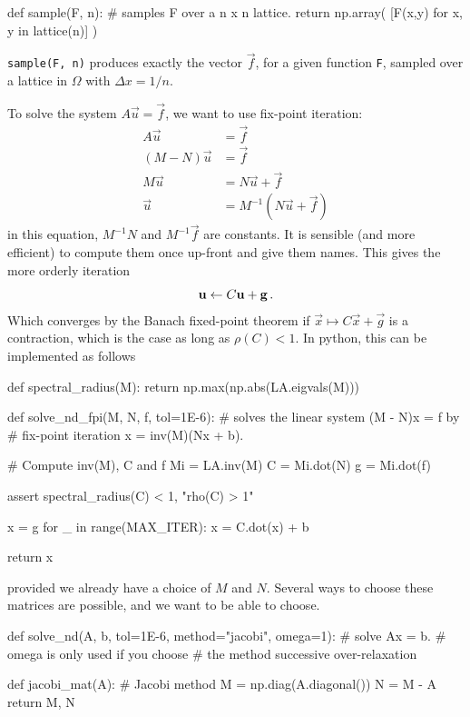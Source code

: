 \documentclass[12pt]{article}
\begin{document}
\begin{multicols}{2}
\begin{python}[
        caption={Program to sample functions over lattices}
    ]
def sample(F, n):
    # samples F over a n x n lattice.
    return np.array(
        [F(x,y) for x, y in lattice(n)]
    )
    \end{python}
    {\tt sample(F, n)} produces exactly the vector $\vec f$,
    for a given function {\tt F}, sampled over a lattice
    in $\Omega$ with $\Delta x = 1/n$.

    To solve the system $A\vec u = \vec f$, we want to use
    fix-point iteration:
    \begin{align*}
        A \vec u &= \vec f \\
        (M - N) \vec u &= \vec f \\
        M \vec u &= N \vec u + \vec f \\
        \vec u &= M^{-1} (N \vec u + \vec f)
    \end{align*}
    in this equation, $M^{-1}N$ and $M^{-1}\vec f$ are constants.
    It is sensible (and more efficient) to compute them once up-front and give them
    names.
    This gives the more orderly iteration
    \[
        \vec u \leftarrow C\vec u + \vec g \,\text.
    \]
    Which converges by the Banach fixed-point theorem if
    $\vec x \mapsto C\vec x + \vec g$ is a contraction,
    which is the case as long as $\rho(C) < 1$.
    In python, this can be implemented as follows
    \begin{python}[
        caption={N-dimensional solver.}
    ]
def spectral_radius(M):
    return np.max(np.abs(LA.eigvals(M)))

def solve_nd_fpi(M, N, f, tol=1E-6):
    # solves the linear system (M - N)x = f by
    # fix-point iteration x = inv(M)(Nx + b).

    # Compute inv(M), C and f
    Mi = LA.inv(M)
    C = Mi.dot(N)
    g = Mi.dot(f)

    assert spectral_radius(C) < 1, "rho(C) > 1"

    x = g
    for _ in range(MAX_ITER):
        x = C.dot(x) + b

    return x
    \end{python}
    provided we already have a choice of $M$ and $N$.
    Several ways to choose these matrices are possible,
    and we want to be able to choose.
    \begin{python}[
        caption={Argument-``parser'' and choice of $M$, $N$.}
    ]
def solve_nd(A, b, tol=1E-6,
        method="jacobi", omega=1):
    # solve Ax = b.
    # omega is only used if you choose
    # the method successive over-relaxation

    def jacobi_mat(A):
        # Jacobi method
        M = np.diag(A.diagonal())
        N = M - A
        return M, N


\end{python}
\end{multicols}
\end{document}
